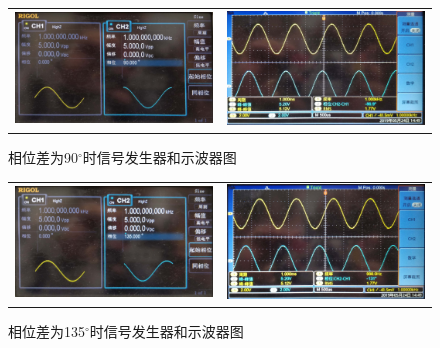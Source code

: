 \documentclass[12pt]{article}
\begin{document}
\begin{enumerate}
    \begin{figure}[htbp]
    \centering
    \begin{tabular}{cc}
    \includegraphics[width=.5\textwidth]{P031}&\includegraphics[width=.5\textwidth]{P021}\\
     \end{tabular}
    \caption{相位差为90$^{\circ}$时信号发生器和示波器图}\label{xwc90d}
  \end{figure}

    \begin{figure}[htbp]
    \centering
    \begin{tabular}{cc}
    \includegraphics[width=.5\textwidth]{P006}&\includegraphics[width=.5\textwidth]{P007}\\
     \end{tabular}
    \caption{相位差为135$^{\circ}$时信号发生器和示波器图}\label{xwc135d}
  \end{figure}


\end{enumerate}
\end{document}
